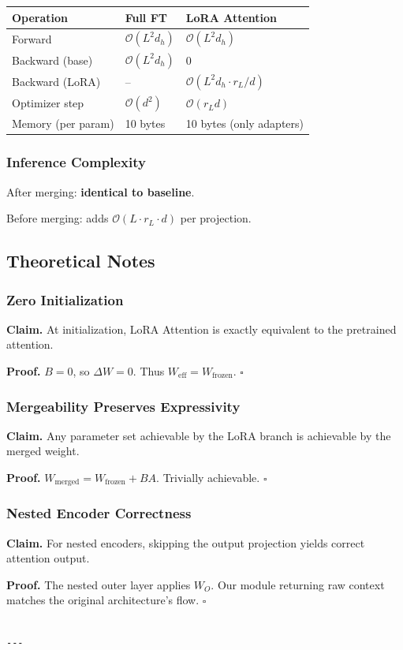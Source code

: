 \begin{table}[H]
\centering
\small
\begin{tabular}{lll}
\toprule
\textbf{Operation} & \textbf{Full FT} & \textbf{LoRA Attention} \\
\midrule
Forward & $\mathcal{O}(L^2 d_h)$ & $\mathcal{O}(L^2 d_h)$ \\
Backward (base) & $\mathcal{O}(L^2 d_h)$ & 0 \\
Backward (LoRA) & -- & $\mathcal{O}(L^2 d_h \cdot r_L/d)$ \\
Optimizer step & $\mathcal{O}(d^2)$ & $\mathcal{O}(r_L d)$ \\
Memory (per param) & 10 bytes & 10 bytes (only adapters) \\
\bottomrule
\end{tabular}
\end{table}

\subsubsection{Inference Complexity}

After merging: \textbf{identical to baseline}.

Before merging: adds $\mathcal{O}(L \cdot r_L \cdot d)$ per projection.

\subsection{Theoretical Notes}

\subsubsection{Zero Initialization}

\textbf{Claim.} At initialization, LoRA Attention is exactly equivalent to the 
pretrained attention.

\textbf{Proof.} $B = 0$, so $\Delta W = 0$. Thus $W_\text{eff} = W_\text{frozen}$. $\square$

\subsubsection{Mergeability Preserves Expressivity}

\textbf{Claim.} Any parameter set achievable by the LoRA branch is achievable 
by the merged weight.

\textbf{Proof.} $W_\text{merged} = W_\text{frozen} + BA$. Trivially achievable. $\square$

\subsubsection{Nested Encoder Correctness}

\textbf{Claim.} For nested encoders, skipping the output projection yields 
correct attention output.

\textbf{Proof.} The nested outer layer applies $W_O$. Our module returning raw 
context matches the original architecture's flow. $\square$
\begin{lstlisting}

---
\end{lstlisting}